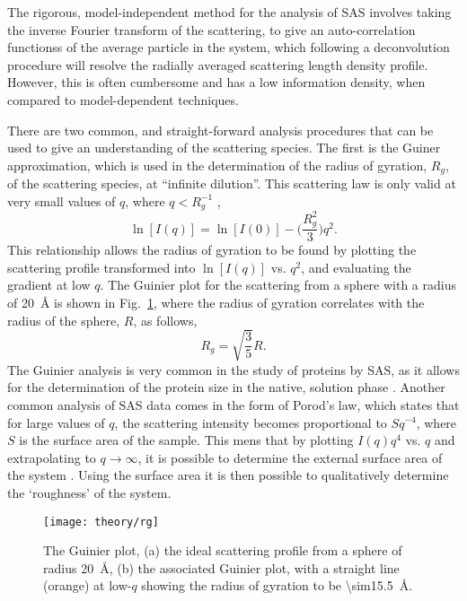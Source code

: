The rigorous, model-independent method for the analysis of SAS involves taking the inverse Fourier transform of the scattering, to give an auto-correlation functionss of the average particle in the system, which following a deconvolution procedure will resolve the radially averaged scattering length density profile.
However, this is often cumbersome and has a low information density, when compared to model-dependent techniques.

There are two common, and straight-forward analysis procedures that can be used to give an understanding of the scattering species.
The first is the Guiner approximation, which is used in the determination of the radius of gyration, $R_g$, of the scattering species, at ``infinite dilution''.
This scattering law is only valid at very small values of $q$, where $q < R_g^{-1}$ \cite{Sivia2011},
%
\begin{equation}
	\ln[I(q)] = \ln[I(0)] - \Bigg(\frac{R_g^2}{3}\Bigg)q^2.
\end{equation}
%
This relationship allows the radius of gyration to be found by plotting the scattering profile transformed into $\ln[I(q)]$ vs. $q^2$, and evaluating the gradient at low $q$.
The Guinier plot for the scattering from a sphere with a radius of \SI{20}{\angstrom} is shown in Fig.~\ref{fig:rg}, where the radius of gyration correlates with the radius of the sphere, $R$, as follows,
%
\begin{equation}
	R_g = \sqrt{\frac{3}{5}}R.
\end{equation}
%
The Guinier analysis is very common in the study of proteins by SAS, as it allows for the determination of the protein size in the native, solution phase \cite{Skou2014}.
Another common analysis of SAS data comes in the form of Porod's law, which states that for large values of $q$, the scattering intensity becomes proportional to $Sq^{-4}$, where $S$ is the surface area of the sample.
This mens that by plotting $I(q)q^4$ vs. $q$ and extrapolating to $q \rightarrow \infty$, it is possible to determine the external surface area of the system \cite{Willis2009}.
Using the surface area it is then possible to qualitatively determine the `roughness' of the system.
%
\begin{figure}
	\centering
	\texttt{[image: theory/rg]}
	\caption{The Guinier plot, (a) the ideal scattering profile from a sphere of radius \SI{20}{\angstrom}, (b) the associated Guinier plot, with a straight line (orange) at low-$q$ showing the radius of gyration to be \SI{\sim15.5}{\angstrom}.}
	\label{fig:rg}
\end{figure}
%

